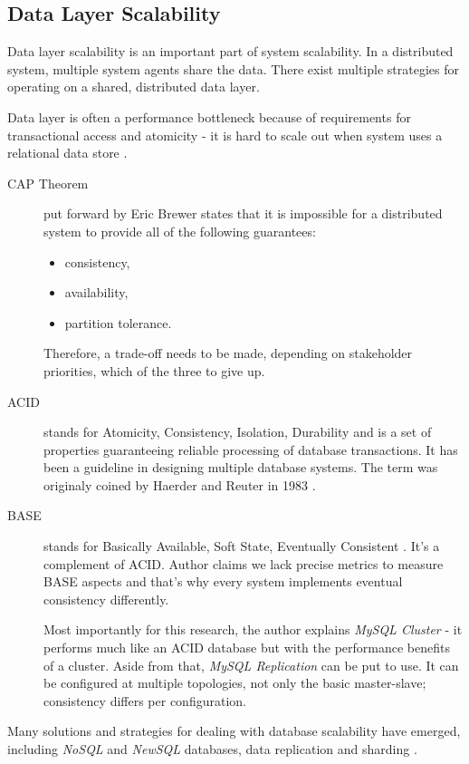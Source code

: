 \documentclass{uvamscse}
\begin{document}
\subsection{Data Layer Scalability}\label{Data Layer Scalability}

Data layer scalability is an important part of system scalability. In a distributed system, multiple system agents share the data. There exist multiple strategies for operating on a shared, distributed data layer.

Data layer is often a performance bottleneck because of requirements for transactional access and atomicity - it is hard to scale out when system uses a relational data store \cite{GroBuy}.

\begin{description}
  \item[CAP Theorem]
  put forward by Eric Brewer \cite{Cap} states that it is impossible for a distributed system to provide all of the following guarantees:
  \begin{itemize}
    \item consistency,
    \item availability,
    \item partition tolerance.
  \end{itemize}
  Therefore, a trade-off needs to be made, depending on stakeholder priorities, which of the three to give up.
  \item[ACID]
   stands for Atomicity, Consistency, Isolation, Durability and is a set of properties guaranteeing reliable processing of database transactions. It has been a guideline in designing multiple database systems. The term was originaly coined by Haerder and Reuter in 1983 \cite{ACID}.
  \item[BASE]
   stands for Basically Available, Soft State, Eventually Consistent \cite{EveCon}. It’s a complement of ACID. Author claims we lack precise metrics to measure BASE aspects and that’s why every system implements eventual consistency differently.

  Most importantly for this research, the author \cite{EveCon} explains \textit{MySQL Cluster} - it performs much like an ACID database but with the performance benefits of a cluster. Aside from that, \textit{MySQL Replication} can be put to use. It can be configured at multiple topologies, not only the basic master-slave; consistency differs per configuration.
\end{description}

Many solutions and strategies for dealing with database scalability have emerged, including \textit{NoSQL} and \textit{NewSQL} databases, data replication and sharding \cite{Amza}.
\end{document}
